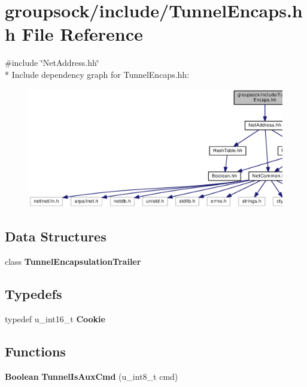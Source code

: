 \section{groupsock/include/\+Tunnel\+Encaps.hh File Reference}
\label{TunnelEncaps_8hh}
{\ttfamily \#include \char`\"{}Net\+Address.\+hh\char`\"{}}\\*
Include dependency graph for Tunnel\+Encaps.\+hh\+:
\nopagebreak
\begin{figure}[H]
\begin{center}
\leavevmode
\includegraphics[width=350pt]{TunnelEncaps_8hh__incl}
\end{center}
\end{figure}
\subsection*{Data Structures}
\begin{DoxyCompactItemize}
\item 
class {\bf Tunnel\+Encapsulation\+Trailer}
\end{DoxyCompactItemize}
\subsection*{Typedefs}
\begin{DoxyCompactItemize}
\item 
typedef u\+\_\+int16\+\_\+t {\bf Cookie}
\end{DoxyCompactItemize}
\subsection*{Functions}
\begin{DoxyCompactItemize}
\item 
{\bf Boolean} {\bf Tunnel\+Is\+Aux\+Cmd} (u\+\_\+int8\+\_\+t cmd)
\end{DoxyCompactItemize}
